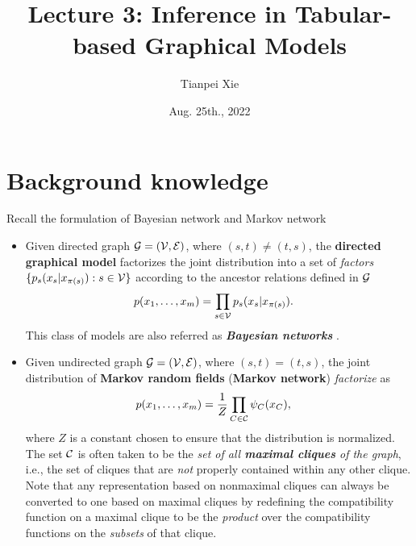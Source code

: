 \documentclass[11pt]{article}
\begin{document}
\title{Lecture 3: Inference in Tabular-based Graphical Models}
\author{ Tianpei Xie}
\date{ Aug. 25th., 2022 }
\maketitle
\tableofcontents
\newpage
\allowdisplaybreaks
\section{Background knowledge}
Recall the formulation of Bayesian network and Markov network
\begin{itemize}
\item Given directed graph ${\mathcal G}=({\mathcal V}, {\mathcal E})$, where $(s,t) \neq (t,s)$, the \textbf{directed graphical model}  factorizes the joint distribution into a set of \emph{factors} $\{p_s(x_s | x_{\pi(s)}): s\in {\mathcal V}\}$ according to the ancestor relations defined in ${\mathcal G}$
\begin{align}
p(x_1, \ldots, x_{m}) &= \prod_{s \in {\mathcal V}}p_s(x_s | x_{\pi(s)}). \label{eqn: dag_graph_factorization}
\end{align} This class of models are also referred as \emph{\textbf{Bayesian networks}} \citep{koller2009probabilistic}.


\item Given undirected graph ${\mathcal G}=({\mathcal V}, {\mathcal E})$, where $(s,t) = (t,s)$, the joint distribution of \textbf{Markov random fields} (\textbf{Markov network}) \emph{factorize} as
\begin{align}
p(x_1, \ldots, x_{m}) &= \frac{1}{Z}\prod_{C \in {\mathcal C}}\psi_{C}(x_{C}),\label{eqn: mrf_graph_factorization}
\end{align} where $Z$ is a constant chosen to ensure that the distribution is normalized. The set ${\mathcal C}$ is often taken to be the \emph{set of all \textbf{maximal cliques} of the graph}, i.e., the set of cliques that are \emph{not} properly contained within any other clique. Note that any representation based on nonmaximal cliques can always be converted to one based on maximal cliques by redefining the compatibility function on a maximal clique to be the \emph{product} over the compatibility functions on the \emph{subsets} of that clique.


\end{itemize}
\end{document}
